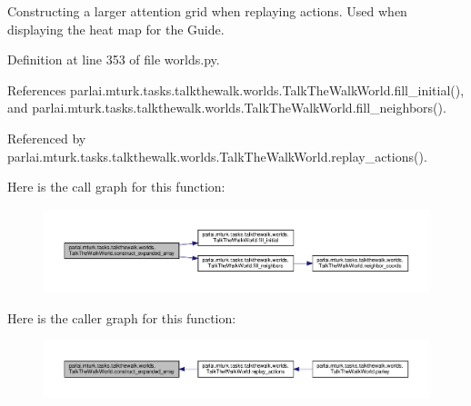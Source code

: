 \begin{DoxyVerb}Constructing a larger attention grid when replaying actions.
   Used when displaying the heat map for the Guide.
\end{DoxyVerb}
 

Definition at line 353 of file worlds.\+py.



References parlai.\+mturk.\+tasks.\+talkthewalk.\+worlds.\+Talk\+The\+Walk\+World.\+fill\+\_\+initial(), and parlai.\+mturk.\+tasks.\+talkthewalk.\+worlds.\+Talk\+The\+Walk\+World.\+fill\+\_\+neighbors().



Referenced by parlai.\+mturk.\+tasks.\+talkthewalk.\+worlds.\+Talk\+The\+Walk\+World.\+replay\+\_\+actions().

Here is the call graph for this function\+:
\nopagebreak
\begin{figure}[H]
\begin{center}
\leavevmode
\includegraphics[width=350pt]{classparlai_1_1mturk_1_1tasks_1_1talkthewalk_1_1worlds_1_1TalkTheWalkWorld_a563e21fcf5b38acb1db594a578fdf7f1_cgraph}
\end{center}
\end{figure}
Here is the caller graph for this function\+:
\nopagebreak
\begin{figure}[H]
\begin{center}
\leavevmode
\includegraphics[width=350pt]{classparlai_1_1mturk_1_1tasks_1_1talkthewalk_1_1worlds_1_1TalkTheWalkWorld_a563e21fcf5b38acb1db594a578fdf7f1_icgraph}
\end{center}
\end{figure}
\mbox{\label{classparlai_1_1mturk_1_1tasks_1_1talkthewalk_1_1worlds_1_1TalkTheWalkWorld_aa1470711aa1a8346a69f5eb0aa774590}} 
